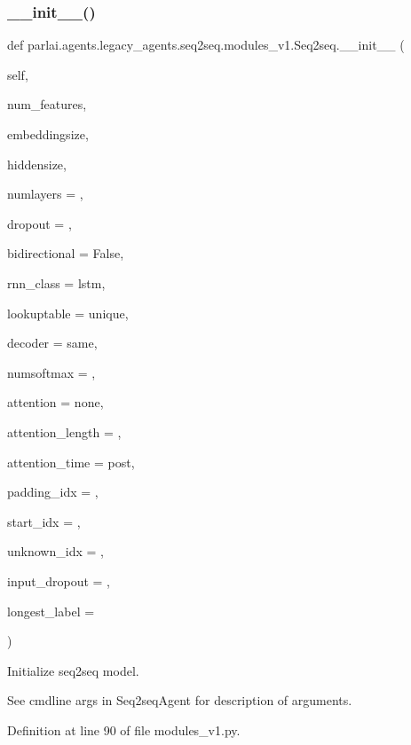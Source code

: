 \subsubsection{\texorpdfstring{\+\_\+\+\_\+init\+\_\+\+\_\+()}{\_\_init\_\_()}}
{\footnotesize\ttfamily def parlai.\+agents.\+legacy\+\_\+agents.\+seq2seq.\+modules\+\_\+v1.\+Seq2seq.\+\_\+\+\_\+init\+\_\+\+\_\+ (\begin{DoxyParamCaption}\item[{}]{self,  }\item[{}]{num\+\_\+features,  }\item[{}]{embeddingsize,  }\item[{}]{hiddensize,  }\item[{}]{numlayers = {},  }\item[{}]{dropout = {},  }\item[{}]{bidirectional = {\ttfamily False},  }\item[{}]{rnn\+\_\+class = {\ttfamily \textquotesingle{}lstm\textquotesingle{}},  }\item[{}]{lookuptable = {\ttfamily \textquotesingle{}unique\textquotesingle{}},  }\item[{}]{decoder = {\ttfamily \textquotesingle{}same\textquotesingle{}},  }\item[{}]{numsoftmax = {},  }\item[{}]{attention = {\ttfamily \textquotesingle{}none\textquotesingle{}},  }\item[{}]{attention\+\_\+length = {},  }\item[{}]{attention\+\_\+time = {\ttfamily \textquotesingle{}post\textquotesingle{}},  }\item[{}]{padding\+\_\+idx = {},  }\item[{}]{start\+\_\+idx = {},  }\item[{}]{unknown\+\_\+idx = {},  }\item[{}]{input\+\_\+dropout = {},  }\item[{}]{longest\+\_\+label = {} }\end{DoxyParamCaption})}

\begin{DoxyVerb}Initialize seq2seq model.

See cmdline args in Seq2seqAgent for description of arguments.
\end{DoxyVerb}
 

Definition at line 90 of file modules\+\_\+v1.\+py.



